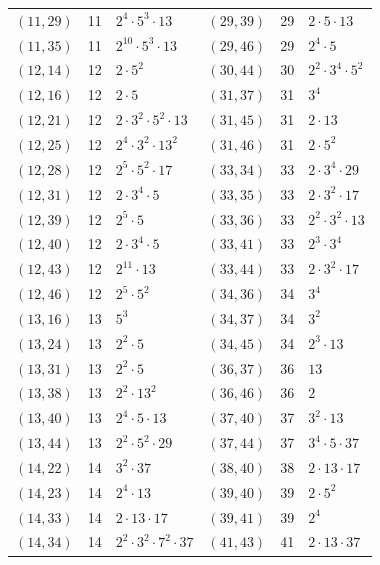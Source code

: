 \documentclass[11pt]{article}
\begin{document}
\begin{longtable}{@{}lrl@{\qquad}lrl@{}}
$(11,29)$ & 11 & $2^{4}\cdot 5^{3}\cdot 13$ & $(29,39)$ & 29 & $2\cdot 5\cdot 13$\\
$(11,35)$ & 11 & $2^{10}\cdot 5^{3}\cdot 13$ & $(29,46)$ & 29 & $2^{4}\cdot 5$\\
$(12,14)$ & 12 & $2\cdot 5^{2}$ & $(30,44)$ & 30 & $2^{2}\cdot 3^{4}\cdot 5^{2}$\\
$(12,16)$ & 12 & $2\cdot 5$ & $(31,37)$ & 31 & $3^{4}$\\
$(12,21)$ & 12 & $2\cdot 3^{2}\cdot 5^{2}\cdot 13$ & $(31,45)$ & 31 & $2\cdot 13$\\
$(12,25)$ & 12 & $2^{4}\cdot 3^{2}\cdot 13^{2}$ & $(31,46)$ & 31 & $2\cdot 5^{2}$\\
$(12,28)$ & 12 & $2^{5}\cdot 5^{2}\cdot 17$ & $(33,34)$ & 33 & $2\cdot 3^{4}\cdot 29$\\
$(12,31)$ & 12 & $2\cdot 3^{4}\cdot 5$ & $(33,35)$ & 33 & $2\cdot 3^{2}\cdot 17$\\
$(12,39)$ & 12 & $2^{5}\cdot 5$ & $(33,36)$ & 33 & $2^{2}\cdot 3^{2}\cdot 13$\\
$(12,40)$ & 12 & $2\cdot 3^{4}\cdot 5$ & $(33,41)$ & 33 & $2^{3}\cdot 3^{4}$\\
$(12,43)$ & 12 & $2^{11}\cdot 13$ & $(33,44)$ & 33 & $2\cdot 3^{2}\cdot 17$\\
$(12,46)$ & 12 & $2^{5}\cdot 5^{2}$ & $(34,36)$ & 34 & $3^{4}$\\
$(13,16)$ & 13 & $5^{3}$ & $(34,37)$ & 34 & $3^{2}$\\
$(13,24)$ & 13 & $2^{2}\cdot 5$ & $(34,45)$ & 34 & $2^{3}\cdot 13$\\
$(13,31)$ & 13 & $2^{2}\cdot 5$ & $(36,37)$ & 36 & $13$\\
$(13,38)$ & 13 & $2^{2}\cdot 13^{2}$ & $(36,46)$ & 36 & $2$\\
$(13,40)$ & 13 & $2^{4}\cdot 5\cdot 13$ & $(37,40)$ & 37 & $3^{2}\cdot 13$\\
$(13,44)$ & 13 & $2^{2}\cdot 5^{2}\cdot 29$ & $(37,44)$ & 37 & $3^{4}\cdot 5\cdot 37$\\
$(14,22)$ & 14 & $3^{2}\cdot 37$ & $(38,40)$ & 38 & $2\cdot 13\cdot 17$\\
$(14,23)$ & 14 & $2^{4}\cdot 13$ & $(39,40)$ & 39 & $2\cdot 5^{2}$\\
$(14,33)$ & 14 & $2\cdot 13\cdot 17$ & $(39,41)$ & 39 & $2^{4}$\\
$(14,34)$ & 14 & $2^{2}\cdot 3^{2}\cdot 7^{2}\cdot 37$ & $(41,43)$ & 41 & $2\cdot 13\cdot 37$\\
\end{longtable}
\endgroup
\end{document}
